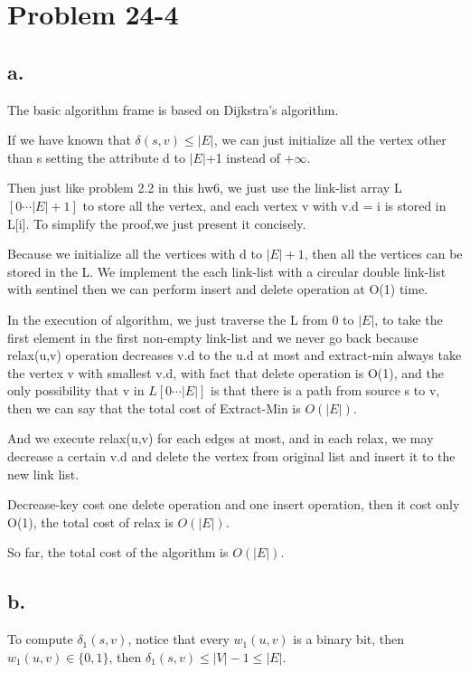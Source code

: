 \documentclass[oneside]{homework} %
\begin{document}
\maketitle
\newpage
\section*{Problem 24-4}
\subsection*{a.}

The basic algorithm frame is based on Dijkstra's algorithm.

If we have known that $\delta(s,v) \leq |E|$, we can just initialize all the vertex other than s setting the attribute d to $|E|$+1 instead of $+\infty$. 

Then just like problem 2.2 in this hw6, we just use the link-list array L$[0\cdots |E|+1]$ to store all the vertex, and each vertex v with v.d = i is stored in L[i]. To simplify the proof,we just present it concisely.

Because we initialize all the vertices with d to $|E|+1$, then all the vertices can be stored in the L. We implement the each link-list with a circular double link-list with sentinel then we can perform insert and delete operation at O(1) time.

In the execution of algorithm, we just traverse the L from 0 to $|E|$, to take the first element in the first non-empty link-list and we never go back because relax(u,v) operation decreases v.d to the u.d at most and extract-min always take the vertex v with smallest v.d, with fact that delete operation is O(1), and the only possibility  that v in $L[0\cdots|E|]$ is that there is a path from source s to v, then we can say that the total cost of Extract-Min is $O(|E|)$.

And we execute relax(u,v) for each edges at most, and in each relax, we may decrease a certain v.d and delete the vertex from original list and insert it to the new link list.  

Decrease-key cost one delete operation and one insert operation, then it cost only O(1), the total cost of relax is $O(|E|)$.

So far, the total cost of the algorithm is $O(|E|)$.

\subsection*{b.}
To compute $\delta_{1}(s,v)$, notice that every $w_{1}(u,v)$ is a binary bit, then $w_{1}(u,v) \in \{0,1\}$, then $\delta_{1}(s,v) \leq |V|-1 \leq |E|$.
\end{document}
